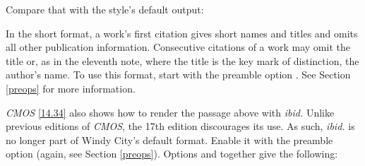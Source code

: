 \documentclass[11pt,letterpaper,oneside]{article}
\begin{document}
\noindent Compare that with the style's default output:

\begin{citeonly}
\item \cite[3]{morrison2004a}
\item \cite[18]{morrison2004a}
\item \cite[18]{morrison2004a}
\item \cite[24--26]{morrison2004a}
\item \cite[401-2]{morrison2004b}
\item \cite[433]{morrison2004b}
\item \cite[37--38]{diaz2008}
\item \cite[403]{morrison2004b}
\item \cite[152]{diaz2008}
\item \cite[201-2]{diaz2008}
\item \cites[240]{morrison2004b}[32]{morrison2004a}
\item \cite[33]{morrison2004a}
\end{citeonly}

\noindent In the short format, a work's first citation gives short
names and titles and omits all other publication information.
Consecutive citations of a work may omit the title or, as in the
eleventh note, where the title is the key mark of distinction, the
author's name. To use this format, start \biblatex with the preamble
option . See Section \ref{preops} for more information.

\textit{CMOS} \ref{14.34} also shows how to render the passage above
with \textit{ibid.} Unlike previous editions of \textit{CMOS}, the
17th edition discourages its use. As such, \textit{ibid.} is no longer
part of Windy City's default format. Enable it with the preamble
option  (again, see Section \ref{preops}). Options
 and  together give the following:
\end{document}
